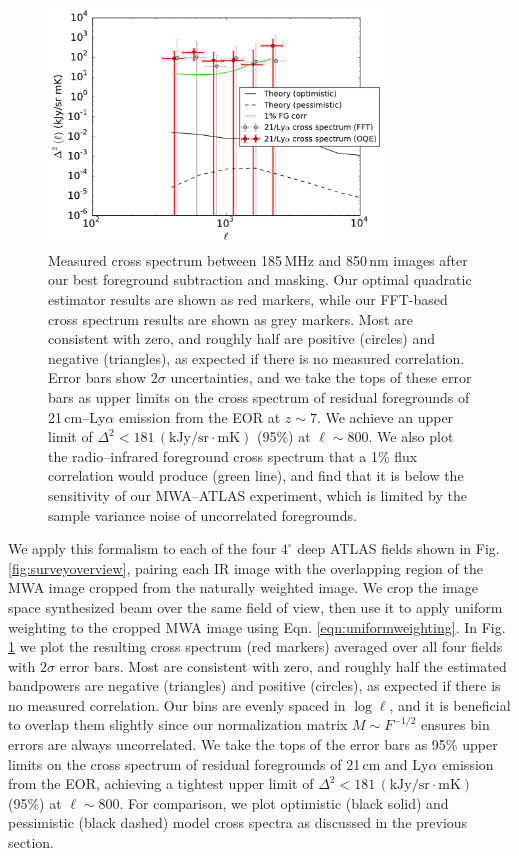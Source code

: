 \documentclass[numberedappendix]{emulateapj}
\begin{document}
\begin{figure}[h]
\centering
\includegraphics[width=3.5in]{mwa_atlas_xspec_with_2Dsimtheory_and_2sigma_errors_6bins.pdf}
\caption[Measured cross spectrum between 185\,MHz and 850\,nm images after our best foreground subtraction and masking.]{Measured cross spectrum between 185\,MHz and 850\,nm images after our best foreground subtraction and masking. Our optimal quadratic estimator results are shown as red markers, while our FFT-based cross spectrum results are shown as grey markers. Most are consistent with zero, and roughly half are positive (circles) and negative (triangles), as expected if there is no measured correlation. Error bars show $2\sigma$ uncertainties, and we take the tops of these error bars as upper limits on the cross spectrum of residual foregrounds of 21\,cm--Ly$\alpha$ emission from the EOR at $z\sim7$. We achieve an upper limit of $\Delta^2<181$\,$(\text{kJy/sr}\cdot \text{mK})$ (95\%) at $\ell\sim800$. We also plot the radio--infrared foreground cross spectrum that a 1\% flux correlation would produce (green line), and find that it is below the sensitivity of our MWA--ATLAS experiment, which is  limited by the sample variance noise of uncorrelated foregrounds.}
\label{fig:resxspec}
\end{figure}

We apply this formalism to each of the four $4^\circ$ deep ATLAS fields shown in Fig. \ref{fig:surveyoverview}, pairing each IR image with the overlapping region of the MWA image cropped from the naturally weighted image. We crop the image space synthesized beam over the same field of view, then use it to apply uniform weighting to the cropped MWA image using Eqn. \ref{eqn:uniformweighting}. In Fig. \ref{fig:resxspec} we plot the resulting cross spectrum (red markers) averaged over all four fields with $2\sigma$ error bars. Most are consistent with zero, and roughly half the estimated bandpowers are negative (triangles) and positive (circles), as expected if there is no measured correlation. Our bins are evenly spaced in $\log \ell$, and it is beneficial to overlap them slightly since our normalization matrix $M\sim F^{-1/2}$ ensures bin errors are always uncorrelated. We take the tops of the error bars as 95\% upper limits on the cross spectrum of residual foregrounds of  21\,cm and Ly$\alpha$ emission from the EOR, achieving a tightest upper limit of $\Delta^2<181$\,$(\text{kJy/sr}\cdot \text{mK})$ (95\%) at $\ell\sim800$. For comparison, we plot optimistic (black solid) and pessimistic (black dashed) model cross spectra as discussed in the previous section.
 
\end{document}
